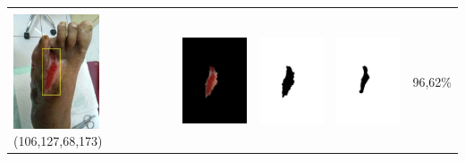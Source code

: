 \begin{table}[H]
\begin{tabular}{|m{1.0in}|m{1.0in}|m{1.0in}|m{1.0in}|m{0.6in}|}
		&  &  & \\
		\includegraphics[width=1.0in]{gambar/hasil_segmentasi/luka_merah/image_3_rect.jpg} {\centering\fontsize{10}{10}\selectfont(106,127,68,173)}&
		\includegraphics[width=1.0in]{gambar/hasil_segmentasi/luka_merah/result_3.jpg}&
		\includegraphics[width=1.0in]{gambar/hasil_segmentasi/luka_merah/mask_r_3.jpg}&
		\includegraphics[width=1.0in]{gambar/hasil_segmentasi/luka_merah/3_r.jpg}&
		96,62\% \\
		\hline


\end{tabular}
\end{table}

